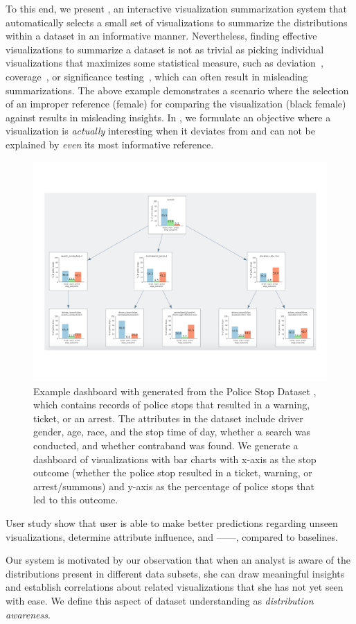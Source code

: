 \par To this end, we present \system, an interactive visualization summarization system that automatically selects a small set of visualizations to summarize the distributions within a dataset in an informative manner. Nevertheless, finding effective visualizations to summarize a dataset is not as trivial as picking individual visualizations that maximizes some statistical measure, such as deviation~\cite{Vartak2015}, coverage~\cite{Sarvghad2017}, or significance testing~\cite{Anand2015}, which can often result in misleading summarizations. The above example demonstrates a scenario where the selection of an improper reference (female) for comparing the visualization (black female) against results in misleading insights. In \system, we formulate an objective where a visualization is \emph{actually} interesting when it deviates from and can not be explained by \emph{even} its most informative reference.
\begin{figure}[h!]
\label{fig:modalities}
\centering
\includegraphics[width=0.7\linewidth]{figures/storyboard.pdf}
\caption{Example dashboard with generated from the Police Stop Dataset \cite{police}, which contains records of police stops that resulted in a warning, ticket, or an arrest. The attributes in the dataset include driver gender, age, race, and the stop time of day, whether a search was conducted, and whether contraband was found. We generate a dashboard of visualizations with bar charts with x-axis as the stop outcome (whether the police stop resulted in a ticket, warning, or arrest/summons) and y-axis as the percentage of police stops that led to this outcome.}
\end{figure} 
User study show that user is able to make better predictions regarding unseen visualizations, determine attribute influence, and ------, compared to baselines.
\par Our system is motivated by our observation that when an analyst is aware of the distributions present in different data subsets, she can draw meaningful insights and establish correlations about related visualizations that she has not yet seen with ease. We define this aspect of dataset understanding as \emph{distribution awareness}. 




